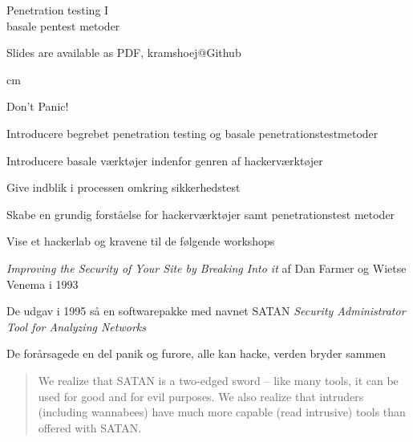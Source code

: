 \documentclass[20pt,landscape,a4paper,footrule]{foils}
\begin{document}

\mytitlepage
{Penetration testing I\\basale pentest metoder}


\vskip 2cm
\centerline{\footnotesize Slides are available as PDF, kramshoej@Github}

\LogoOn



 cm

\centerline{\color{titlecolor}\LARGE Don't Panic!}


\begin{list1}
\item Introducere begrebet penetration testing og basale penetrationstestmetoder
\item Introducere basale værktøjer indenfor genren af hackerværktøjer
\item Give indblik i processen omkring sikkerhedstest
\item Skabe en grundig forståelse for hackerværktøjer
  samt penetrationstest metoder
\item Vise et hackerlab og kravene til de følgende workshops
\end{list1}



\begin{list1}
\item \emph{Improving the Security of Your Site by Breaking Into it} af
Dan Farmer og Wietse Venema i 1993
\item De udgav i 1995 så en softwarepakke med navnet SATAN
\emph{Security Administrator Tool for Analyzing Networks}
\item De forårsagede en del panik og furore, alle kan hacke, verden bryder sammen

\vskip 1cm
\begin{quote}
We realize that SATAN is a two-edged sword -- like
many tools, it can be used for good and for evil
purposes. We also realize that intruders (including
wannabees) have much more capable (read intrusive)
tools than offered with SATAN.
\end{quote}
\end{list1}
\end{document}

